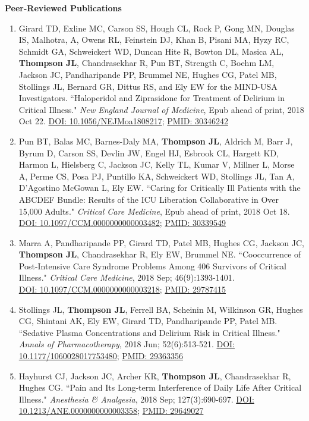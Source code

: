 \documentclass[5pt]{article}
\begin{document}
\noindent \textbf{Peer-Reviewed Publications}
\begin{enumerate}
\item Girard TD, Exline MC, Carson SS, Hough CL, Rock P, Gong MN, Douglas IS, Malhotra, A, Owens RL, Feinstein DJ, Khan B, Pisani MA, Hyzy RC, Schmidt GA, Schweickert WD, Duncan Hite R, Bowton DL, Masica AL, \textbf{Thompson JL}, Chandrasekhar R, Pun BT, Strength C, Boehm LM, Jackson JC, Pandharipande PP, Brummel NE, Hughes CG, Patel MB, Stollings JL, Bernard GR, Dittus RS, and Ely EW for the MIND-USA Investigators. ``Haloperidol and Ziprasidone for Treatment of Delirium in Critical Illness." \emph{New England Journal of Medicine}, Epub ahead of print, 2018 Oct 22. \href{https://doi.org/10.1056/NEJMoa1808217}{DOI: 10.1056/NEJMoa1808217}; \href{https://www.ncbi.nlm.nih.gov/pubmed/30346242}{PMID: 30346242}
\item Pun BT, Balas MC, Barnes-Daly MA, \textbf{Thompson JL}, Aldrich M, Barr J, Byrum D, Carson SS, Devlin JW, Engel HJ, Esbrook CL, Hargett KD, Harmon L, Hielsberg C, Jackson JC, Kelly TL, Kumar V, Millner L, Morse A, Perme CS, Posa PJ, Puntillo KA, Schweickert WD, Stollings JL, Tan A, D'Agostino McGowan L, Ely EW. ``Caring for Critically Ill Patients with the ABCDEF Bundle: Results of the ICU Liberation Collaborative in Over 15,000 Adults." \emph{Critical Care Medicine}, Epub ahead of print, 2018 Oct 18. \href{https://doi.org/10.1097/CCM.0000000000003482}{DOI: 10.1097/CCM.0000000000003482}; \href{https://www.ncbi.nlm.nih.gov/pubmed/30339549}{PMID: 30339549}
\item Marra A, Pandharipande PP, Girard TD, Patel MB, Hughes CG, Jackson JC, \textbf{Thompson JL}, Chandrasekhar R, Ely EW, Brummel NE. ``Cooccurrence of Post-Intensive Care Syndrome Problems Among 406 Survivors of Critical Illness." \emph{Critical Care Medicine}, 2018 Sep; 46(9):1393-1401.\\ \href{https://doi.org/10.1097/CCM.0000000000003218}{DOI: 10.1097/CCM.0000000000003218}; \href{https://www.ncbi.nlm.nih.gov/pubmed/29787415}{PMID: 29787415}
\item Stollings JL, \textbf{Thompson JL}, Ferrell BA, Scheinin M, Wilkinson GR, Hughes CG, Shintani AK, Ely EW, Girard TD, Pandharipande PP, Patel MB. ``Sedative Plasma Concentrations and Delirium Risk in Critical Illness." \emph{Annals of Pharmacotherapy}, 2018 Jun; 52(6):513-521. \href{https://doi.org/10.1177/1060028017753480}{DOI: 10.1177/1060028017753480}; \href{https://www.ncbi.nlm.nih.gov/pubmed/29363356}{PMID: 29363356}
\item Hayhurst CJ, Jackson JC, Archer KR, \textbf{Thompson JL}, Chandrasekhar R, Hughes CG. ``Pain and Its Long-term Interference of Daily Life After Critical Illness." \emph{Anesthesia \& Analgesia}, 2018 Sep; 127(3):690-697. \href{https://doi.org/10.1213/ANE.0000000000003358}{DOI: 10.1213/ANE.0000000000003358}; \href{https://www.ncbi.nlm.nih.gov/pubmed/29649027}{PMID: 29649027}

\end{enumerate}
\end{document}
